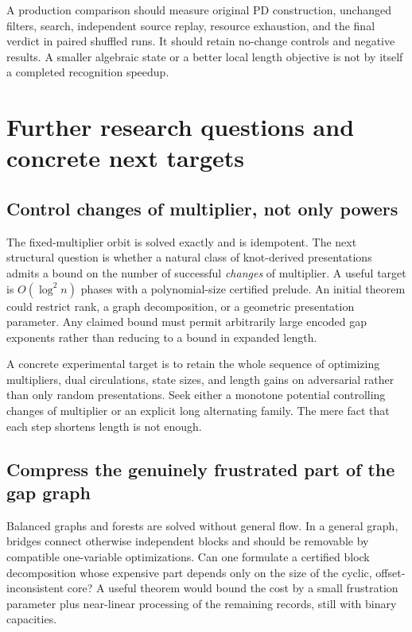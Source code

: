 \documentclass[11pt,letterpaper]{article}
\theoremstyle{definition}
\theoremstyle{remark}\newtheorem{remark}[theorem]{Remark}
\begin{document}
A production comparison should measure original PD construction, unchanged
filters, search, independent source replay, resource exhaustion, and the final
verdict in paired shuffled runs. It should retain no-change controls and
negative results. A smaller algebraic state or a better local length objective
is not by itself a completed recognition speedup.

\section{Further research questions and concrete next targets}
\label{sec:future}

\subsection{Control changes of multiplier, not only powers}

The fixed-multiplier orbit is solved exactly and is idempotent. The next
structural question is whether a natural class of knot-derived presentations
admits a bound on the number of successful \emph{changes} of multiplier.
A useful target is $O(\log^2 n)$ phases with a polynomial-size certified
prelude. An initial theorem could restrict rank, a graph decomposition, or a
geometric presentation parameter. Any claimed bound must permit arbitrarily
large encoded gap exponents rather than reducing to a bound in expanded
length.

A concrete experimental target is to retain the whole sequence of optimizing
multipliers, dual circulations, state sizes, and length gains on adversarial
rather than only random presentations. Seek either a monotone potential
controlling changes of multiplier or an explicit long alternating family.
The mere fact that each step shortens length is not enough.

\subsection{Compress the genuinely frustrated part of the gap graph}

Balanced graphs and forests are solved without general flow. In a general
graph, bridges connect otherwise independent blocks and should be removable
by compatible one-variable optimizations. Can one formulate a certified
block decomposition whose expensive part depends only on the size of the
cyclic, offset-inconsistent core? A useful theorem would bound the cost by a
small frustration parameter plus near-linear processing of the remaining
records, still with binary capacities.
\end{document}

